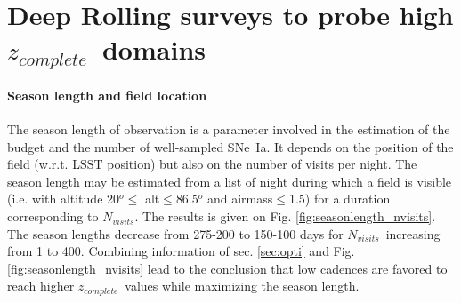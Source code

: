 \documentclass[skiphelvet,twocolumn]{aastex63}
\newcommand{\snrb}{\mbox{$SNR^b$}}
\newcommand{\sne}{{SNe~Ia}}
\newcommand{\zcomp}{\mbox{$z_{complete}$}}
\newcommand{\nvisits}{$N_{visits}$}
\begin{document}

\section{Deep Rolling surveys to probe high \zcomp~domains}
\label{sec:scenario}
\paragraph{Season length and field location}
The season length of observation is a parameter involved in the estimation of the budget and the number of well-sampled \sne.  It depends on the position of the field (w.r.t. LSST position) but also on the number of visits per night. The season length may be estimated from a list of night during which a field is visible (i.e. with altitude 20$^o\leq$ alt$\leq$86.5$^o$ and airmass$\leq$1.5) for a duration corresponding to \nvisits.  The results is given on Fig. \ref{fig:seasonlength_nvisits}. The season lengths decrease from 275-200 to 150-100 days for \nvisits~increasing from 1 to 400.  Combining information of sec. \ref{sec:opti} and Fig. \ref{fig:seasonlength_nvisits} lead to the conclusion that low cadences are favored to reach higher \zcomp~values while maximizing the season length.
\end{document}
